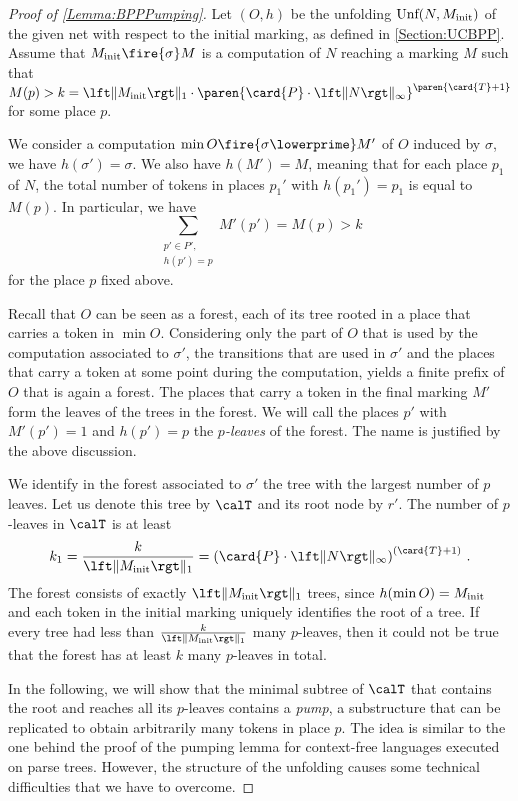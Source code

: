 \documentclass[../../diss.tex]{subfiles}
\begin{document}
\begin{proof}[Proof of \cref{Lemma:BPPPumping}]
    Let $(O,h)$ be the unfolding $\text{Unf}(N, M_{\text{init}})$ of the given net with respect to the initial marking, as defined in \cref{Section:UCBPP}.
    Assume that $\Minit \fire{\sigma} M$ is a computation of $N$ reaching a marking $M$ such that $M(p) > k = \normone{\Minit} \cdot \paren{ \card{P} \cdot \norminf{N}}^{ \paren{\card{T} + 1} }$ for some place $p$.

    We consider a computation $\min O \fire{\sigma\lowerprime} M'$ of $O$ induced by $\sigma$, \ie we have $h(\sigma') = \sigma$.
    We also have $h(M') = M$, meaning that for each place $p_1$ of $N$, the total number of tokens in places $p_1'$ with $h(p_1') = p_1$ is equal to $M(p)$.
    In particular, we have
    \[
        \sum_{\substack{p' \in P',\\  h(p') = p}} M' (p') = M(p) > k
    \]
    for the place $p$ fixed above.

    Recall that $O$ can be seen as a forest, each of its tree rooted in a place that carries a token in $\min O$.
    Considering only the part of $O$ that is used by the computation associated to $\sigma'$, \ie the transitions that are used in $\sigma'$ and the places that carry a token at some point during the computation, yields a finite prefix of $O$ that is again a forest.
    The places that carry a token in the final marking $M'$ form the leaves of the trees in the forest.
    We will call the places $p'$ with $M'(p') = 1$ and $h(p') = p$ the \emph{$p$-leaves} of the forest.
    The name is justified by the above discussion.

    We identify in the forest associated to $\sigma'$ the tree with the largest number of $p$ leaves.
    Let us denote this tree by $\calT$ and its root node by $r'$.
    The number of $p$-leaves in $\calT$ is at least
    \[
        k_1 = \frac{k}{\normone{M_\init}} = {(\card{P} \cdot \norminf{N})}^{(\card{T} + 1)}
        \ .
    \]
    The forest consists of exactly $\normone{\Minit}$ trees, since $h(\min O) = M_{\text{init}}$ and each token in the initial marking uniquely identifies the root of a tree.
    If every tree had less than $\frac{k}{\normone{\Minit}}$ many $p$-leaves, then it could not be true that the forest has at least $k$ many $p$-leaves in total.

    In the following, we will show that the minimal subtree of $\calT$ that contains the root and reaches all its $p$-leaves contains a \emph{pump}, \ie a substructure that can be replicated to obtain arbitrarily many tokens in place $p$.
    The idea is similar to the one behind the proof of the pumping lemma for context-free languages executed on parse trees.
    However, the structure of the unfolding causes some technical difficulties that we have to overcome.


\end{proof}
\end{document}
